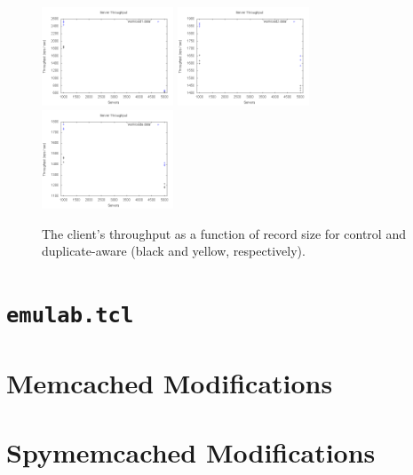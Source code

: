 \documentclass[11pt,titlepage]{article}
\begin{document}
\begin{figure}[h!]
  \centering
  \includegraphics[width=0.35\textwidth]{workload1_throughput.png}
  \includegraphics[width=0.35\textwidth]{workload2_throughput.png}
  \includegraphics[width=0.35\textwidth]{workloada_throughput.png}
  \caption[Throughput]{The client's throughput as a function of record size for
  control and duplicate-aware (black and yellow, respectively).}
  \label{throughput}
\end{figure}

\pagebreak

\appendix
\section{\texttt{emulab.tcl}} \label{app:tcl}



\section{Memcached Modifications} \label{app:memcached}



\section{Spymemcached Modifications} \label{app:spymemcached}



\pagebreak

\nocite{*}


\end{document}
